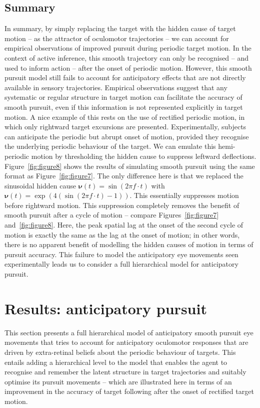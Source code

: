 \documentclass[a4paper]{article} %
\begin{document}
\subsection{Summary}

In summary, by simply replacing the target with the hidden cause of
target motion -- as the attractor of oculomotor trajectories -- we can
account for empirical observations of improved pursuit during periodic
target motion. In the context of active inference, this smooth
trajectory can only be recognised -- and used to inform action -- after
the onset of periodic motion. However, this smooth pursuit model still
fails to account for anticipatory effects that are not directly
available in sensory trajectories. Empirical observations suggest that
any systematic or regular structure in target motion can facilitate the
accuracy of smooth pursuit, even if this information is not represented
explicitly in target motion. A nice example of this rests on the use of
rectified periodic motion, in which only rightward target excursions are
presented. Experimentally, subjects can anticipate the periodic but
abrupt onset of motion, provided they recognise the underlying periodic
behaviour of the target. We can emulate this hemi-periodic motion by
thresholding the hidden cause to suppress leftward deflections. Figure~\ref{fig:figure8}
shows the results of simulating smooth pursuit using the same format as
Figure~\ref{fig:figure7}. The only difference here is that we replaced the sinusoidal
hidden cause
$\bm{\nu}(t) = \sin(2\pi f \cdot t)$ %
with
$\bm{\nu}(t)= \exp(4(\sin(2\pi f \cdot t)-1))$.
This essentially suppresses motion before rightward motion. This
suppression completely removes the benefit of smooth pursuit after a
cycle of motion -- compare Figures~\ref{fig:figure7} and~\ref{fig:figure8}. Here, the peak spatial lag
at the onset of the second cycle of motion is exactly the same as the
lag at the onset of motion; in other words, there is no apparent benefit
of modelling the hidden causes of motion in terms of pursuit accuracy.
This failure to model the anticipatory eye movements seen experimentally
leads us to consider a full hierarchical model for anticipatory pursuit.
\section{Results: anticipatory pursuit}
\label{sec:anticip}

This section presents a full hierarchical model of anticipatory smooth
pursuit eye movements that tries to account for anticipatory oculomotor
responses that are driven by extra-retinal beliefs about the periodic
behaviour of targets. This entails adding a hierarchical level to the
model that enables the agent to recognise and remember the latent
structure in target trajectories and suitably optimise its pursuit
movements -- which are illustrated here in terms of an improvement in
the accuracy of target following after the onset of rectified target
motion.
\end{document}
